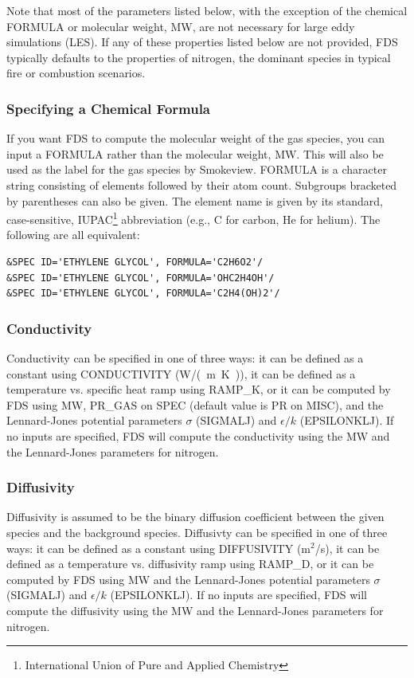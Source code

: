 \documentclass[11pt]{book}
\begin{document}
Note that most of the parameters listed below, with the exception of the chemical {\ct FORMULA} or molecular weight, {\ct MW}, are not necessary for large eddy simulations (LES). If any of these properties listed below are not provided, FDS typically defaults to the properties of nitrogen, the dominant species in typical fire or combustion scenarios.

\subsubsection{Specifying a Chemical Formula}
\label{info:FORMULA}

If you want FDS to compute the molecular weight of the gas species, you can input a {\ct FORMULA} rather than the molecular weight, {\ct MW}. This will also be used as the label for the gas species by Smokeview.  {\ct FORMULA} is a character string consisting of elements followed by their atom count. Subgroups bracketed by parentheses can also be given.  The element name is given by its standard, case-sensitive, IUPAC\footnote{International Union of Pure and Applied Chemistry} abbreviation (e.g., C for carbon, He for helium). The following are all equivalent:
\begin{lstlisting}
&SPEC ID='ETHYLENE GLYCOL', FORMULA='C2H6O2'/
&SPEC ID='ETHYLENE GLYCOL', FORMULA='OHC2H4OH'/
&SPEC ID='ETHYLENE GLYCOL', FORMULA='C2H4(OH)2'/
\end{lstlisting}

\subsubsection{Conductivity}

Conductivity can be specified in one of three ways: it can be defined as a constant using {\ct CONDUCTIVITY} (\si{W/(m.K)}), it can be defined as a temperature vs. specific heat ramp  using {\ct RAMP\_K}, or it can be computed by FDS using {\ct MW}, {\ct PR\_GAS} on {\ct SPEC} (default value is {\ct PR} on {\ct MISC}), and the Lennard-Jones potential parameters $\sigma$ ({\ct SIGMALJ}) and $\epsilon/k$ ({\ct EPSILONKLJ}).  If no inputs are specified, FDS will compute the conductivity using the {\ct MW} and the Lennard-Jones parameters for nitrogen.

\subsubsection{Diffusivity}

Diffusivity is assumed to be the binary diffusion coefficient between the given species and the background species. Diffusivty can be specified in one of three ways:  it can be defined as a constant using {\ct DIFFUSIVITY} (m$^2$/s), it can be defined as a temperature vs. diffusivity ramp  using {\ct RAMP\_D}, or it can be computed by FDS using {\ct MW} and the Lennard-Jones potential parameters $\sigma$ ({\ct SIGMALJ}) and $\epsilon/k$ ({\ct EPSILONKLJ}).  If no inputs are specified, FDS will compute the diffusivity using the {\ct MW} and the Lennard-Jones parameters for nitrogen.
\end{document}
